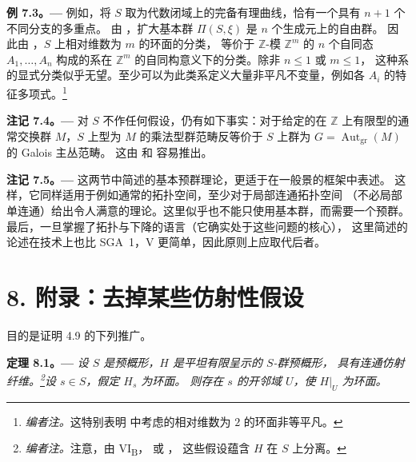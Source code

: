 \par\medskip\noindent{}\textbf{例 7.3。---}\enspace
例如，将 \(S\) 取为代数闭域上的完备有理曲线，恰有一个具有 \(n+1\) 个不同分支的多重点。
由 ，扩大基本群 \(\Pi(S,\xi)\) 是 \(n\) 个生成元上的自由群。
因此由 ，\(S\) 上相对维数为 \(m\) 的环面的分类，
等价于 \(\mathbb{Z}\)-模 \(\mathbb{Z}^m\) 的 \(n\) 个自同态 \(A_1,\ldots,A_n\)
构成的系在 \(\mathbb{Z}^m\) 的自同构意义下的分类。除非 \(n\leq 1\) 或 \(m\leq 1\)，
这种系的显式分类似乎无望。至少可以为此类系定义大量非平凡不变量，例如各 \(A_i\)
的特征多项式。\footnote{\textit{编者注。}这特别表明
 中考虑的相对维数为 \(2\) 的环面非等平凡。}

\par\medskip\noindent{}\textbf{注记 7.4。---}\enspace
对 \(S\) 不作任何假设，仍有如下事实：对于给定的在 \(\mathbb{Z}\) 上有限型的通常交换群
\(M\)，\(S\) 上型为 \(M\) 的乘法型群范畴反等价于 \(S\) 上群为
\(G=\operatorname{Aut}_{\mathrm{gr}}(M)\) 的 Galois 主丛范畴。
这由  和  容易推出。

\par\medskip\noindent{}\textbf{注记 7.5。---}\enspace
这两节中简述的基本预群理论，更适于在一般景的框架中表述。
这样，它同样适用于例如通常的拓扑空间，至少对于局部连通拓扑空间
（不必局部单连通）给出令人满意的理论。这里似乎也不能只使用基本群，而需要一个预群。
最后，一旦掌握了拓扑与下降的语言（它确实处于这些问题的核心），
这里简述的论述在技术上也比 SGA~1，V 更简单，因此原则上应取代后者。

\section*{8. 附录：去掉某些仿射性假设}

目的是证明 4.9 的下列推广。

\par\medskip\noindent{}\textbf{定理 8.1。---}\enspace
\emph{设 \(S\) 是预概形，\(H\) 是平坦有限呈示的 \(S\)-群预概形，
具有连通仿射纤维。\footnote{\textit{编者注。}注意，由 VI\textsubscript{B}，
 或 ，
这些假设蕴含 \(H\) 在 \(S\) 上分离。}设 \(s\in S\)，假定 \(H_s\) 为环面。
则存在 \(s\) 的开邻域 \(U\)，使 \(H|_U\) 为环面。}

